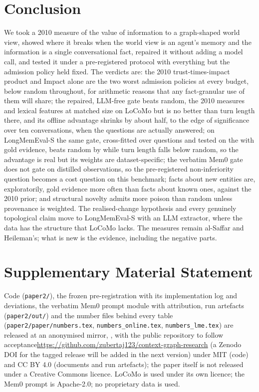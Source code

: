 \documentclass{ceurart}
\newif\ifshowtodos
\DeclareRobustCommand{\todo}[1]{\ifshowtodos{\color{red}\textbf{[TODO:} #1\textbf{]}}\fi}
\newcommand{\code}[1]{\texttt{#1}}
\begin{document}
\section{Conclusion}
\label{sec:conclusion}
We took a 2010 measure of the value of information to a graph-shaped world view, showed where it breaks when the world view is an agent's memory and the information is a single conversational fact, repaired it without adding a model call, and tested it under a pre-registered protocol with everything but the admission policy held fixed. The verdicts are: the 2010 trust-times-impact product and Impact alone are the two worst admission policies at every budget, below random throughout, for arithmetic reasons that any fact-granular use of them will share; the repaired, LLM-free gate beats random, the 2010 measures and lexical features at matched size on LoCoMo but is no better than turn length there, and its offline advantage shrinks by about half, to the edge of significance over ten conversations, when the questions are actually answered; on LongMemEval-S the same gate, cross-fitted over \lmeNq{} questions and tested on the \lmeKHitFitRandom{} with gold evidence, beats random by \lmeDHitFitRandom{} while turn length falls below random, so the advantage is real but its weights are dataset-specific; the verbatim Mem0 gate does not gate on distilled observations, so the pre-registered non-inferiority question becomes a cost question on this benchmark; facts about new entities are, exploratorily, gold evidence more often than facts about known ones, against the 2010 prior; and structural novelty admits more poison than random unless provenance is weighted. The realised-change hypothesis and every genuinely topological claim move to LongMemEval-S with an LLM extractor, where the data has the structure that LoCoMo lacks. The measures remain al-Saffar and Heileman's; what is new is the evidence, including the negative parts.

\section*{Supplementary Material Statement}
Code (\code{paper2/}), the frozen pre-registration with its implementation log and deviations, the verbatim Mem0 prompt module with attribution, run artefacts (\code{paper2/out/}) and the number files behind every table (\code{paper2/paper/numbers.tex}, \code{numbers\_online.tex}, \code{numbers\_lme.tex}) are released at \ifanon an anonymised mirror, \todo{anonymised repository URL}, with the public repository to follow acceptance\else \url{https://github.com/zubertaj123/context-graph-research}\fi{} (a Zenodo DOI for the tagged release will be added in the next version) under MIT (code) and CC BY 4.0 (documents and run artefacts); the paper itself is not released under a Creative Commons licence. LoCoMo is used under its own licence; the Mem0 prompt is Apache-2.0; no proprietary data is used.
\end{document}
